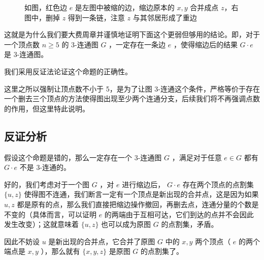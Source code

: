 \documentclass[11pt, a4paper]{ctexart}
\begin{document}
\begin{figure}[H]
    \caption{如图，红色边 $e$ 是左图中被缩的边，缩边原本的 $x,y$ 合并成点 $z$，右图中，删掉 $z$ 得到一条链，注意 $z$ 与其邻居形成了重边}
\end{figure}

这就是为什么我们要大费周章并谨慎地证明下面这个更弱但够用的结论。即，对于一个顶点数 $n\ge 5$ 的 3-连通图 $G$ ，一定存在一条边 $e$ ，使得缩边后的结果 $G\cdot e$ 是 3-连通图。

我们采用反证法论证这个命题的正确性。

这里之所以强制让顶点数不小于 5，是为了让图 3-连通这个条件，严格等价于存在一个删去三个顶点的方法使得图出现至少两个连通分支，后续我们将不再强调点数的作用，但这里特此说明。

\subsection{反证分析}
假设这个命题是错的，那么一定存在一个 3-连通图 $G$ ，满足对于任意 $e\in G$ 都有 $G\cdot e$ 不是 3-连通的。

好的，我们考虑对于一个图 $G$ ，对 $e$ 进行缩边后， $G\cdot e$ 存在两个顶点的点割集 $\{u,z\}$ 使得图不连通，我们断言一定有一个顶点是新出现的合并点，这是因为如果 $u,z$ 都是原有的点，那么我们直接把缩边操作撤回，再删去点，连通分量的个数是不变的（具体而言，可以证明 $e$ 的两端由于互相可达，它们到达的点并不会因此发生改变）；这就意味着 $\{u,z\}$ 也可以成为原图 $G$ 的点割集，矛盾。

因此不妨设 $u$ 是新出现的合并点，它合并了原图 $G$ 中的 $x,y$ 两个顶点（ $e$ 的两个端点是 $x,y$ ），那么就有 $\{x,y,z\}$ 是原图 $G$ 的点割集了。
\end{document}
